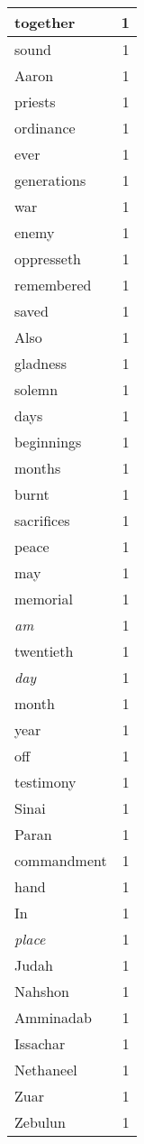 \begin{center}
\begin{longtable}{l|r}
together & 1 \\ \hline
sound & 1 \\ \hline
Aaron & 1 \\ \hline
priests & 1 \\ \hline
ordinance & 1 \\ \hline
ever & 1 \\ \hline
generations & 1 \\ \hline
war & 1 \\ \hline
enemy & 1 \\ \hline
oppresseth & 1 \\ \hline
remembered & 1 \\ \hline
saved & 1 \\ \hline
Also & 1 \\ \hline
gladness & 1 \\ \hline
solemn & 1 \\ \hline
days & 1 \\ \hline
beginnings & 1 \\ \hline
months & 1 \\ \hline
burnt & 1 \\ \hline
sacrifices & 1 \\ \hline
peace & 1 \\ \hline
may & 1 \\ \hline
memorial & 1 \\ \hline
\emph{am} & 1 \\ \hline
twentieth & 1 \\ \hline
\emph{day} & 1 \\ \hline
month & 1 \\ \hline
year & 1 \\ \hline
off & 1 \\ \hline
testimony & 1 \\ \hline
Sinai & 1 \\ \hline
Paran & 1 \\ \hline
commandment & 1 \\ \hline
hand & 1 \\ \hline
In & 1 \\ \hline
\emph{place} & 1 \\ \hline
Judah & 1 \\ \hline
Nahshon & 1 \\ \hline
Amminadab & 1 \\ \hline
Issachar & 1 \\ \hline
Nethaneel & 1 \\ \hline
Zuar & 1 \\ \hline
Zebulun & 1 \\ \hline

\end{longtable}
\end{center}
